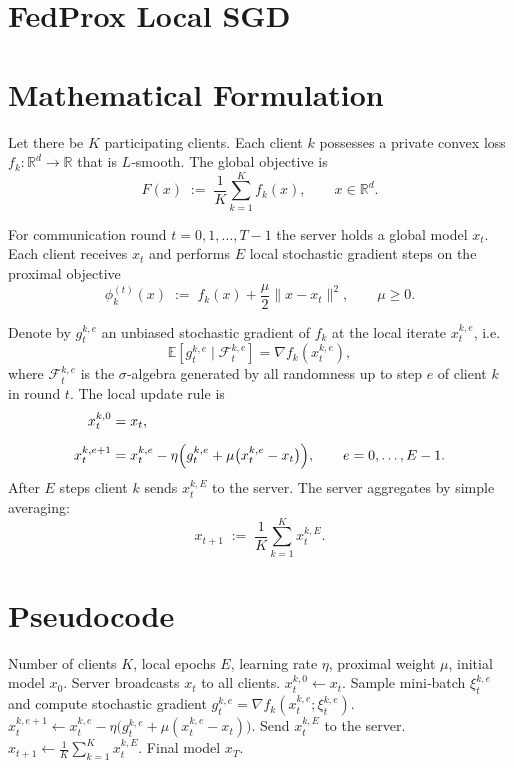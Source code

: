 \documentclass{article}
\newcommand{\E}{\mathbb{E}}
\newcommand{\R}{\mathbb{R}}
\begin{document}
\section*{FedProx Local SGD}

\section*{Mathematical Formulation}
Let there be $K$ participating clients.  
Each client $k$ possesses a private convex loss $f_k:\R^d\to\R$ that is $L$‑smooth.  
The global objective is 
\[
F(x)\;:=\;\frac1K\sum_{k=1}^{K}f_k(x),\qquad x\in\R^{d}.
\]

For communication round $t=0,1,\dots,T-1$ the server holds a global model $x_t$.  
Each client receives $x_t$ and performs $E$ local stochastic gradient steps on the
proximal objective
\[
\phi_k^{(t)}(x)\;:=\;f_k(x)+\frac{\mu}{2}\|x-x_t\|^{2},\qquad \mu\ge0 .
\]

Denote by $g_{t}^{k,e}$ an unbiased stochastic gradient of $f_k$ at the local iterate
$x_{t}^{k,e}$, i.e.
\[
\E\!\left[g_{t}^{k,e}\mid\mathcal{F}_{t}^{k,e}\right]=\nabla f_k(x_{t}^{k,e}),
\]
where $\mathcal{F}_{t}^{k,e}$ is the $\sigma$‑algebra generated by all randomness up to
step $e$ of client $k$ in round $t$.
The local update rule is
\begin{align}
x_{t}^{k,0}&=x_t,\\[2mm]
x_{t}^{k,e+1}&=x_{t}^{k,e}
-\eta\Bigl(g_{t}^{k,e}+\mu\bigl(x_{t}^{k,e}-x_t\bigr)\Bigr),
\qquad e=0,\dots,E-1. \label{eq:local_update}
\end{align}
After $E$ steps client $k$ sends $x_{t}^{k,E}$ to the server.  
The server aggregates by simple averaging:
\[
x_{t+1}\;:=\;\frac1K\sum_{k=1}^{K}x_{t}^{k,E}. \tag{Server aggregation}
\]

\section*{Pseudocode}
\begin{algorithm}[H]
\caption{FedProx Local SGD}
\begin{algorithmic}[1]
\REQUIRE Number of clients $K$, local epochs $E$, learning rate $\eta$, proximal weight $\mu$,
initial model $x_0$.
    \STATE Server broadcasts $x_t$ to all clients.
        \STATE $x_{t}^{k,0}\leftarrow x_t$.
            \STATE Sample mini‑batch $\xi_{t}^{k,e}$ and compute stochastic gradient 
            $g_{t}^{k,e}=\nabla f_k(x_{t}^{k,e};\xi_{t}^{k,e})$.
            \STATE $x_{t}^{k,e+1}\leftarrow x_{t}^{k,e}
                -\eta\bigl(g_{t}^{k,e}+\mu(x_{t}^{k,e}-x_t)\bigr)$.
        \ENDFOR
        \STATE Send $x_{t}^{k,E}$ to the server.
    \ENDFOR
    \STATE $x_{t+1}\leftarrow\frac1K\sum_{k=1}^{K}x_{t}^{k,E}$.
\ENDFOR
\ENSURE Final model $x_T$.
\end{algorithmic}
\end{algorithm}
\end{document}
